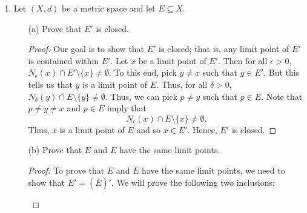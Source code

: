 \documentclass[a4paper]{article}
\begin{document}
\begin{enumerate}
\begin{enumerate}
\begin{proof}
                Now, with (2), let \( x \in (A \cup B)' \). Then \( x  \) is a limit point of \( A \cup  B \). Thus, for all \( \epsilon > 0 \) we have
                \[  {N}_{\epsilon}(x) \cap (A \cup B) \setminus  \{ x \} \neq \emptyset. \]
                Pick a point in this intersection, say, \( p \neq x   \). Note that \( p \in A \cup B  \). So, either \( p \in A  \) or \( p \in B  \). If \( p \in A  \), then \( x  \) is a limit point of \( A  \). Thus, \( x \in A' \) and so \( x \in A' \cup B' \). If \( p \in B  \), then \( x  \) is a limit point of \( B  \) and so \( x \in B' \). Thus, \( x \in A' \cup B' \). Therefore, we have \( (A \cup B)' \subseteq A' \cup B' \) which proves (2). 

                With (1) and (2), we have 
                \[  A' \cup B' = (A \cup B)'. \]
                \end{proof}
        \end{enumerate}
    \item Let \( (X,d) \) be a metric space and let \( E \subseteq X  \).
        \begin{enumerate}
            \item[(a)] Prove that \( E' \) is closed.
                \begin{proof}
                Our goal is to show that \( E' \) is closed; that is, any limit point of \( E'  \) is contained within \( E' \). Let \( x  \) be a limit point of \( E'  \). Then for all \( \epsilon > 0 \), \( {N}_{\epsilon}(x) \cap E' \setminus  \{ x \}  \neq \emptyset  \). To this end, pick \( y \neq x  \) such that \( y \in E' \). But this tells us that \( y  \) is a limit point of \( E  \). Thus, for all \( \delta > 0  \), \( {N}_{\delta}(y) \cap E \setminus  \{ y \} \neq \emptyset \). Thus, we can pick \( p \neq y  \) such that \( p \in E  \). Note that \( p \neq y \neq x  \) and \( p \in E  \) imply that  
                \[  {N}_{\epsilon}(x) \cap E \setminus  \{ x \} \neq \emptyset. \]
                Thus, \( x  \) is a limit point of \( E  \) and so \( x \in E' \). Hence, \( E' \) is closed.
                \end{proof}
            \item[(b)] Prove that \( E  \) and \( \overline{E} \) have the same limit points.
                \begin{proof}
                To prove that \( E  \) and \( \overline{E} \) have the same limit points, we need to show that \( E' = (\overline{E})' \). We will prove the following two inclusions:
                \begin{enumerate}

\end{enumerate}
\end{proof}
\end{enumerate}
\end{enumerate}
\end{document}
